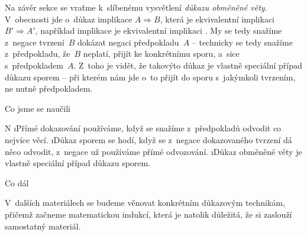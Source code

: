 Na závěr sekce se vraťme k~slíbenému vysvětlení \textit{důkazu obměněné věty}. V~obecnosti jde o~důkaz implikace $A \Rightarrow B$, která je ekvivalentní implikaci $B' \Rightarrow A'$, například implikace  je ekvivalentní implikaci . My se tedy snažíme z~negace tvrzení~$B$ dokázat negaci předpokladu~$A$ -- technicky se tedy snažíme z~předpokladu, že~$B$ neplatí, přijít ke konkrétnímu sporu, a~sice s~předpokladem~$A$. Z~toho je vidět, že takovýto důkaz je vlast\-ně speciální případ důkazu sporem -- při kterém nám jde o~to přijít do sporu s~jakýmkoli tvrzením, ne nutně předpokladem.

\sec Co jsme se naučili 

\begitems \style N
\i Přímé dokazování používáme, když se snažíme z~předpokladů odvodit co nejvíce věcí.
\i Důkaz sporem se hodí, když se z~negace dokazovaného tvrzení dá něco odvodit, z~negace už používáme přímé odvozování.
\i Důkaz obměněné věty je vlastně speciální případ důkazu sporem.
\enditems 

\sec Co dál

V~dalších materiálech se budeme věnovat konkrétním důkazovým technikám, přičemž začneme matematickou indukcí, která je natolik důležitá, že si zaslouží samostatný materiál.

\DisplayExerciseSolutions

\DisplayHints

\DisplayProblemSolutions

\bye